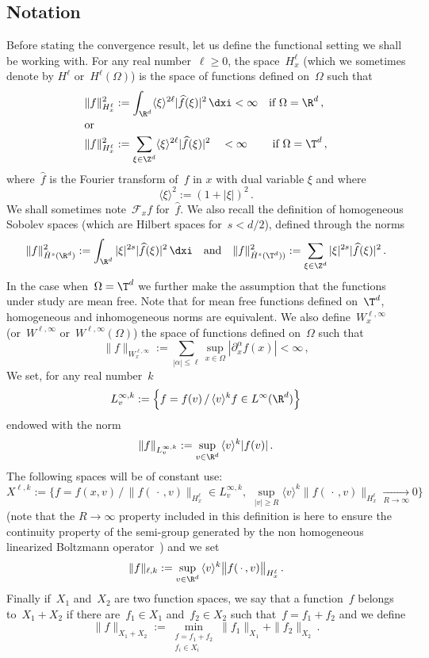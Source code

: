 \subsection{Notation}
Before stating the convergence result, let us define the functional setting we shall be working with. For any real number~$\ell\geq 0$, the space~$H^\ell_x$ (which we sometimes denote by $H^\ell$ or~$H^\ell(\Omega)$) is the space of functions defined on~$\Omega$ such that
\begin{align*}
\|f\|_{H^\ell_x}^2 &:=\int_{\R^d} \langle \xi\rangle^{2\ell} |\widehat f (\xi)|^2\, \dxi <\infty \quad\text{if } \Omega = \R^d \,,\\
\intertext{or}
\|f\|_{H^\ell_x}^2 &:=\sum_{\xi \in \Z^d} \langle \xi\rangle^{2\ell} |\widehat f (\xi)|^2 \quad<\infty \phantom{\, \dxi}\text{if } \Omega = \T^d \,,
\end{align*}
where~$\widehat f $ is the Fourier transform of~$f$ in $x$ with dual variable $\xi$ and where
\[
\langle \xi\rangle^{2 }:= (1+|\xi|)^2\,.
\]
We shall sometimes note~${\mathcal F}_x f$ for~$\widehat f$. We also recall the definition of homogeneous Sobolev spaces (which are Hilbert spaces for~$s<d/2$), defined through the norms
\[
\|f\|_{ \dot H^s(\R^d)}^2:= \int_{\R^d} | \xi |^{2s} |\widehat f(\xi)|^2 \, \dxi \quad \text{and} \quad \|f\|_{ \dot H^s(\T^d))}^2:=\sum_{\xi \in \Z^d} | \xi |^{2s} |\widehat f(\xi)|^2 \,.
\]
In the case when~$ \Omega = \T^d$ we further make the assumption that the functions under study are mean free. Note that for mean free functions defined on~$\T^d$, homogeneous and inhomogeneous norms are equivalent. We also define~$W^{\ell,\infty}_x$ (or~$W^{\ell,\infty}$ or~$W^{\ell,\infty}(\Omega)$) the space of functions defined on~$\Omega$ such that
\[
\|f\|_{W^{\ell,\infty}_x} :=\sum_{|\alpha| \le \ell} \sup_{x \in \Omega}|\partial^\alpha_x f(x)|<\infty \,,
\]
We set, for any real number~$k$
\[
L^{\infty,k}_v :=\Big\{f = f(v) \, / \, \langle v\rangle^k f \in L^\infty (\R^d)\Big\}
\]
endowed with the norm
\[
\|f\|_{L^{\infty,k}_v}:=\sup_{v\in\R^d} \, \langle v\rangle^k |f(v) | \,.
\]
The following spaces will be of constant use:
\begin{equation}\label{Xellk}
X^{\ell,k}:=\Big\{f = f(x,v) \, / \,\|f(\,\cdot\,,v)\|_{H^\ell_x}\in L^{\infty,k}_v, \, \, \sup_{|v| \ge R} \langle v\rangle^k \|f(\,\cdot\,,v)\|_{H^\ell_x} \xrightarrow[R \to \infty]{}0\Big\}
\end{equation}
(note that the $R\to\infty$ property included in this definition is here to ensure the continuity property of the semi-group generated by the non homogeneous linearized Boltzmann operator~\cite{Ukai}) and we set
\[
\|f\|_{\ell,k}:=\sup_{v\in\R^d} \, \langle v\rangle^k \big\|f(\,\cdot\,,v)\big\|_{H^\ell_x}\,.
\]
Finally if~$X_1$ and~$X_2$ are two function spaces, we say that a function~$f$ belongs to~$X_1+X_2$ if there are~$f_1 \in X_1$ and~$f_2\in X_2$ such that~$f =f_1+f_2$ and we define
\[
\|f\|_{X_1+X_2} := \min_{
\begin{smallmatrix}f = f_1+f_2\\f_i \in X_i
\end{smallmatrix}}\|f_1\|_{X_1} + \|f_2\|_{X_2} \,.
\]

